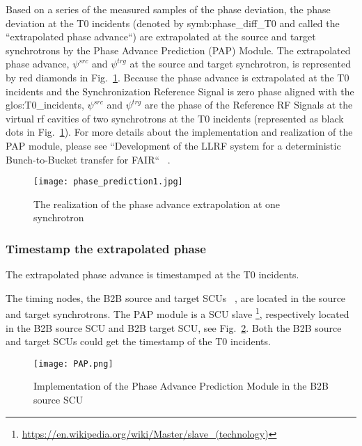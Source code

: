 Based on a series of the measured samples of the phase deviation, the phase deviation at the T0 incidents (denoted by \gls{symb:phase_diff_T0} and called the ``extrapolated phase advance``) are extrapolated at the source and target synchrotrons by the Phase Advance Prediction (\gls{PAP}) Module. The extrapolated phase advance, $\psi^\mathit{src}$ and $\psi^\mathit{trg}$ at the source and target synchrotron, is represented by red diamonds in Fig.~\ref{phase_prediction1}. Because the phase advance is extrapolated at the T0 incidents and the Synchronization Reference Signal is zero phase aligned with the \gls{glos:T0_incidents}, $\psi^\mathit{src}$ and $\psi^\mathit{trg}$ are the phase of the Reference RF Signals at the virtual rf cavities of two synchrotrons at the T0 incidents (represented as black dots in Fig.~\ref{phase_prediction1}). For more details about the implementation and realization of the PAP module, please see ``Development of the LLRF system for a deterministic Bunch-to-Bucket transfer for FAIR`` ~\cite{ferrand_development_????}.   
\begin{figure}[!htb]
   \centering   
   \texttt{[image: phase\_prediction1.jpg]}
   \caption{The realization of the phase advance extrapolation at one synchrotron}
   \label{phase_prediction1}
\end{figure}
\subsubsection{Timestamp the extrapolated phase}
The extrapolated phase advance is timestamped at the T0 incidents.

The timing nodes, the B2B source and target SCUs ~\cite{beck_new_2012, thieme_scu_2013}, are located in the source and target synchrotrons. The PAP module is a SCU slave \footnote{\url{https://en.wikipedia.org/wiki/Master/slave_(technology)}}, respectively located in the B2B source SCU and B2B target SCU, see Fig.~\ref{PAP}. Both the B2B source and target SCUs could get the timestamp of the T0 incidents. 
 \begin{figure}[!htb]
   \centering   
   \texttt{[image: PAP.png]}
   \caption{Implementation of the Phase Advance Prediction Module in the B2B source SCU}
   \label{PAP}
\end{figure}

